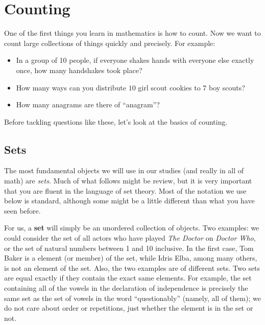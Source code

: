 \documentclass[12pt,]{book}
\newcommand{\terminology}[1]{\textbf{#1}}
\theoremstyle{plain}
\theoremstyle{definition}
\theoremstyle{definition}
\theoremstyle{definition}
\numberwithin{equation}{chapter}
\begin{document}
\chapter[{Counting}]{Counting}\label{ch_counting}
\hypertarget{p-509}{}%
One of the first things you learn in mathematics is how to count. Now we want to count large collections of things quickly and precisely. For example: \leavevmode%
\begin{itemize}[label=\textbullet]
\item{}\hypertarget{p-510}{}%
In a group of 10 people, if everyone shakes hands with everyone else exactly once, how many handshakes took place?%
\item{}\hypertarget{p-511}{}%
How many ways can you distribute \(10\) girl scout cookies to \(7\) boy scouts?%
\item{}\hypertarget{p-512}{}%
How many anagrams are there of ``anagram''?%
\end{itemize}
%
\par
\hypertarget{p-513}{}%
Before tackling questions like these, let's look at the basics of counting.%
\typeout{************************************************}
\typeout{************************************************}
\section[{Sets}]{Sets}\label{sec_intro-sets}
\hypertarget{p-514}{}%
The most fundamental objects we will use in our studies (and really in all of math) are \emph{sets}. Much of what follows might be review, but it is very important that you are fluent in the language of set theory. Most of the notation we use below is standard, although some might be a little different than what you have seen before.%
\par
\hypertarget{p-515}{}%
For us, a \terminology{set}  will simply be an unordered collection of objects. Two examples: we could consider the set of all actors who have played \emph{The Doctor} on \emph{Doctor Who}, or the set of natural numbers between 1 and 10 inclusive. In the first case, Tom Baker is a element (or member) of the set, while Idris Elba, among many others, is not an element of the set. Also, the two examples are of different sets. Two sets are equal exactly if they contain the exact same elements. For example, the set containing all of the vowels in the declaration of independence is precisely the same set as the set of vowels in the word ``questionably'' (namely, all of them); we do not care about order or repetitions, just whether the element is in the set or not.%
\typeout{************************************************}
\typeout{************************************************}
\end{document}
